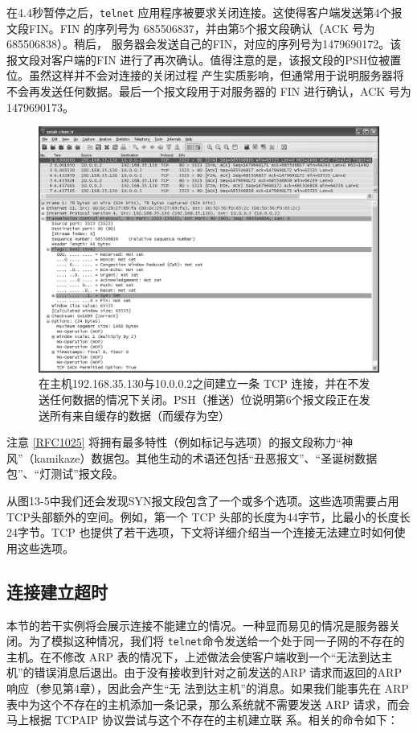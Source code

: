在4.4秒暂停之后，\verb|telnet| 应用程序被要求关闭连接。这使得客户端发送第4个报文段FIN。FIN 的序列号为
685506837，并由第5个报文段确认（ACK 号为 685506838）。稍后，
服务器会发送自己的FIN，对应的序列号为1479690172。该报文段对客户端的FIN
进行了再次确认。值得注意的是，该报文段的PSH位被置位。虽然这样并不会对连接的关闭过程
产生实质影响，但通常用于说明服务器将不会再发送任何数据。最后一个报文段用于对服务器的 FIN 进行确认，ACK 号为 1479690173。

\begin{figure}[ht]
  \includegraphics[width=1.0\textwidth]{imgs/13/13-5.png}
  \caption{在主机192.168.35.130与10.0.0.2之间建立一条 TCP
  连接，并在不发送任何数据的情况下关闭。PSH（推送）位说明第6个报文段正在发送所有来自缓存的数据（而缓存为空）}
\end{figure}

注意 \href{https://www.rfc-editor.org/rfc/rfc1025}{[RFC1025]}
将拥有最多特性（例如标记与选项）的报文段称力“神风”（kamikaze）数据包。其他生动的术语还包括“丑恶报文”、“圣诞树数据包”、“灯测试”报文段。

从图13-5中我们还会发现SYN报文段包含了一个或多个选项。这些选项需要占用 TCP头部额外的空间。例如，第一个 TCP
头部的长度为44字节，比最小的长度长24字节。TCP
也提供了若干选项，下文将详细介绍当一个连接无法建立时如何使用这些选项。
\subsection{连接建立超时}
本节的若干实例将会展示连接不能建立的情况。一种显而易见的情况是服务器关闭。为了模拟这种情况，我们将
\verb|telnet|命令发送给一个处于同一子网的不存在的主机。在不修改
ARP 表的情况下，上述做法会使客户端收到一个“无法到达主机”的错误消息后退出。由于没有接收到针对之前发送的ARP 请求而返回的ARP
响应（参见第4章），因此会产生“无
法到达主机”的消息。如果我们能事先在 ARP 表中为这个不存在的主机添加一条记录，那么系统就不需要发送 ARP 请求，而会马上根据
TCPAIP 协议尝试与这个不存在的主机建立联
系。相关的命令如下：

